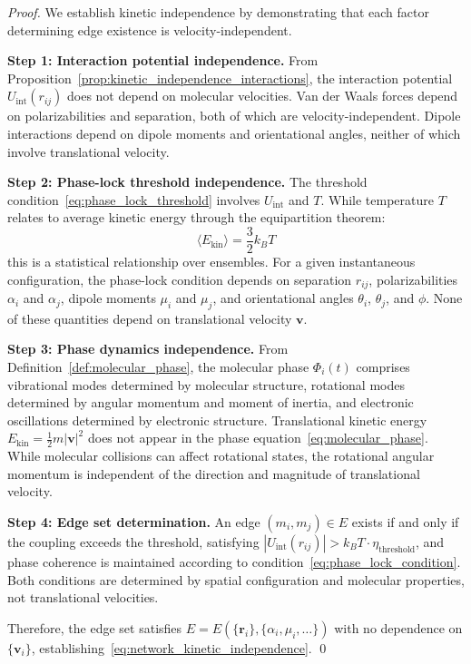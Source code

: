 \documentclass[12pt,a4paper]{article}
\theoremstyle{definition}
\theoremstyle{remark}
\begin{document}
\begin{proof}
We establish kinetic independence by demonstrating that each factor determining edge existence is velocity-independent.

\textbf{Step 1: Interaction potential independence.}
From Proposition~\ref{prop:kinetic_independence_interactions}, the interaction potential $U_{\text{int}}(r_{ij})$ does not depend on molecular velocities. Van der Waals forces depend on polarizabilities and separation, both of which are velocity-independent. Dipole interactions depend on dipole moments and orientational angles, neither of which involve translational velocity.

\textbf{Step 2: Phase-lock threshold independence.}
The threshold condition~\eqref{eq:phase_lock_threshold} involves $U_{\text{int}}$ and $T$. While temperature $T$ relates to average kinetic energy through the equipartition theorem:
\begin{equation}
\langle E_{\text{kin}} \rangle = \frac{3}{2} k_B T
\end{equation}
this is a statistical relationship over ensembles. For a given instantaneous configuration, the phase-lock condition depends on separation $r_{ij}$, polarizabilities $\alpha_i$ and $\alpha_j$, dipole moments $\mu_i$ and $\mu_j$, and orientational angles $\theta_i$, $\theta_j$, and $\phi$. None of these quantities depend on translational velocity $\mathbf{v}$.

\textbf{Step 3: Phase dynamics independence.}
From Definition~\ref{def:molecular_phase}, the molecular phase $\Phi_i(t)$ comprises vibrational modes determined by molecular structure, rotational modes determined by angular momentum and moment of inertia, and electronic oscillations determined by electronic structure. Translational kinetic energy $E_{\text{kin}} = \frac{1}{2}m|\mathbf{v}|^2$ does not appear in the phase equation~\eqref{eq:molecular_phase}. While molecular collisions can affect rotational states, the rotational angular momentum is independent of the direction and magnitude of translational velocity.

\textbf{Step 4: Edge set determination.}
An edge $(m_i, m_j) \in E$ exists if and only if the coupling exceeds the threshold, satisfying $|U_{\text{int}}(r_{ij})| > k_B T \cdot \eta_{\text{threshold}}$, and phase coherence is maintained according to condition~\eqref{eq:phase_lock_condition}. Both conditions are determined by spatial configuration and molecular properties, not translational velocities.

Therefore, the edge set satisfies $E = E(\{\mathbf{r}_i\}, \{\alpha_i, \mu_i, \ldots\})$ with no dependence on $\{\mathbf{v}_i\}$, establishing~\eqref{eq:network_kinetic_independence}. \qed
\end{proof}
\end{document}
